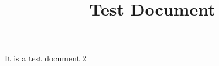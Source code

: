 \documentclass{report}
\begin{document}
\title{Test Document}
\maketitle

It is a test document 2
\end{document}
